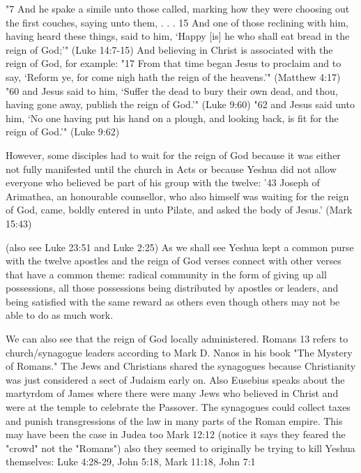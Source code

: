 \documentclass[11pt]{article}
\begin{document}
"7 And he spake a simile unto those called, marking how they were choosing out the first couches, saying unto them, . . . 
15 And one of those reclining with him, having heard these things, said to him, `Happy [is] he who shall eat bread in the reign of God;'" (Luke 14:7-15)
And believing in Christ is associated with the reign of God,\cite{reign of god} for example:
"17 From that time began Jesus to proclaim and to say, `Reform ye, for come nigh hath the reign of the heavens.'" (Matthew 4:17)
"60 and Jesus said to him, `Suffer the dead to bury their own dead, and thou, having gone away, publish the reign of God.'" (Luke 9:60)
"62 and Jesus said unto him, `No one having put his hand on a plough, and looking back, is fit for the reign of God.'" (Luke 9:62)
 
However, some disciples had to wait for the reign of God because it was either not fully manifested until the church in Acts or because Yeshua did not allow everyone who believed be part of his group with the twelve: 
'43 Joseph of Arimathea, an honourable counsellor, who also himself was waiting for the reign of God, came, boldly entered in unto Pilate, and asked the body of Jesus.' (Mark 15:43)

(also see Luke 23:51 and Luke 2:25) As we shall see Yeshua kept a common purse with the twelve apostles and the reign of God verses connect with other verses that have a common theme: radical community in the form of giving up all possessions, all those possessions being distributed by apostles or leaders, and being satisfied with the same reward as others even though others may not be able to do as much work.

We can also see that the reign of God locally administered. Romans 13 refers to church/synagogue leaders according to Mark D. Nanos in his book "The Mystery of Romans." The Jews and Christians shared the synagogues because Christianity was just considered a sect of Judaism early on. Also Eusebius speaks about the martyrdom of James where there were many Jews who believed in Christ and were at the temple to celebrate the Passover. \cite{martyrdom of james} The synagogues could collect taxes and punish transgressions of the law in many parts of the Roman empire.%
This may have been the case in Judea too Mark 12:12 (notice it says they feared the "crowd" not the "Romans") also they seemed to originally be trying to kill Yeshua themselves: Luke 4:28-29, John 5:18, Mark 11:18, John 7:1
\end{document}
